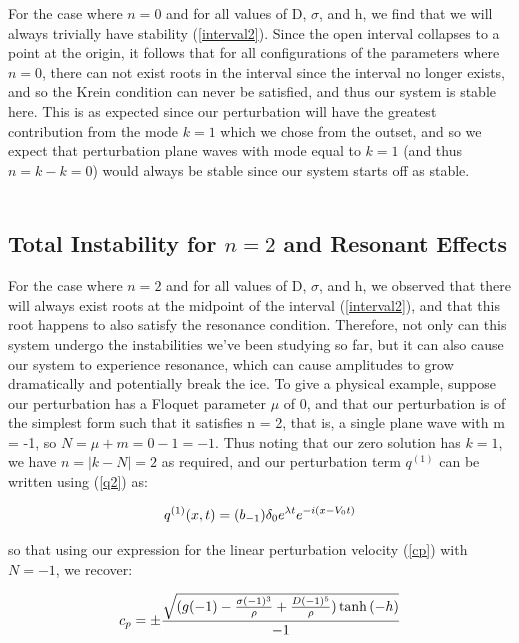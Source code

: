 \documentclass{article}
\begin{document}
For the case where \(n = 0\) and for all values of D, \(\sigma\), and h, we find that we will always trivially have stability (\ref{interval2}). Since the open interval collapses to a point at the origin, it follows that for all configurations of the parameters where \(n = 0\), there can not exist roots in the interval since the interval no longer exists, and so the Krein condition can never be satisfied, and thus our system is stable here. This is as expected since our perturbation will have the greatest contribution from the mode \(k = 1\) which we chose from the outset, and so we expect that perturbation plane waves with mode equal to \(k = 1\) (and thus \(n=k-k=0\)) would always be stable since our system starts off as stable. 
\\
\\


\subsection{Total Instability for \(n = 2\) and Resonant Effects}
For the case where \(n = 2\) and for all values of D, \(\sigma\), and h, we observed that there will always exist roots at the midpoint of the interval (\ref{interval2}), and that this root happens to also satisfy the resonance condition. Therefore, not only can this system undergo the instabilities we've been studying so far, but it can also cause our system to experience resonance, which can cause amplitudes to grow dramatically and potentially break the ice. To give a physical example, suppose our perturbation has a Floquet parameter \(\mu\) of 0, and that our perturbation is of the simplest form such that it satisfies n = 2, that is, a single plane wave with m = -1, so \( N = \mu + m = 0 - 1 = -1\). Thus noting that our zero solution has \( k = 1\), we have \(n = |k - N| = 2\) as required, and our perturbation term \(q^{(1)}\) can be written using (\ref{q2}) as:

\begin{equation} \label{q3}
  q^{(1)}(x,t) = (b_{-1})\delta_{0}e^{\lambda t}e^{-i(x-V_{0}t)}
\\
\end{equation} 

so that using our expression for the linear perturbation velocity (\ref{cp}) with \(N = -1\), we recover:

\begin{equation} \label{cp}
  c_{p} = \pm \frac{\sqrt{(g(-1) - \frac{\sigma(-1)^3}{\rho} + \frac{D(-1)^5}{\rho})\tanh{(-h)}}}{-1} 
\\
\end{equation} 
\end{document}
